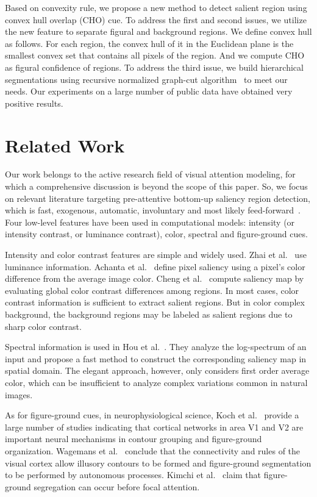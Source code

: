 \documentclass{article}
\begin{document}
Based on convexity rule, we propose a new method to detect salient region using convex hull overlap (CHO) cue. To address the first and second issues, we utilize the new feature to separate figural and background regions. We define convex hull as follows. For each region, the convex hull of it in the Euclidean plane is the smallest convex set that contains all pixels of the region. And we compute CHO as figural confidence of regions. To address the third issue, we build hierarchical segmentations using recursive normalized graph-cut algorithm~\cite{shi2000normalized} to meet our needs. Our experiments on a large number of public data have obtained very positive results.

\section{Related Work}
Our work belongs to the active research field of visual attention modeling, for which a comprehensive discussion is beyond the scope of this paper. So, we focus on relevant literature targeting pre-attentive bottom-up saliency region detection, which is fast, exogenous, automatic, involuntary and most likely feed-forward~\cite{borji2013state}. Four low-level features have been used in computational models: intensity (or intensity contrast, or luminance contrast), color, spectral and figure-ground cues.

Intensity and color contrast features are simple and widely used. Zhai et al.~\cite{zhai2006visual} use luminance information. Achanta et al.~\cite{achanta2009frequency} define pixel saliency using a pixel’s color difference from the average image color. Cheng et al.~\cite{cheng2015global} compute saliency map by evaluating global color contrast differences among regions. In most cases, color contrast information is sufficient to extract salient regions. But in color complex background, the background regions may be labeled as salient regions due to sharp color contrast.

Spectral information is used in Hou et al.~\cite{hou2007saliency}. They analyze the log-spectrum of an input and propose a fast method to construct the corresponding saliency map in spatial domain. The elegant approach, however, only considers first order average color, which can be insufficient to analyze complex variations common in natural images.

As for figure-ground cues, in neurophysiological science, Koch et al.~\cite{Koch2004The} provide a large number of studies indicating that cortical networks in area V1 and V2 are important neural mechanisms in contour grouping and figure-ground organization. Wagemans et al.~\cite{wagemans2012century} conclude that the connectivity and rules of the visual cortex allow illusory contours to be formed and figure-ground segmentation to be performed by autonomous processes. Kimchi et al.~\cite{kimchi2008figure} claim that figure-ground segregation can occur before focal attention.
\end{document}
